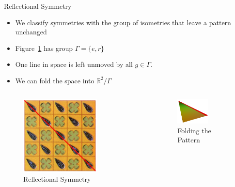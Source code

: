 \documentclass[12pt]{beamer}
\begin{document}
\begin{frame}{Reflectional Symmetry}
    \begin{itemize}
        \item We classify symmetries with the group of isometries that
            leave a pattern unchanged
        \item Figure~\ref{fig:ref_sym} has group $\Gamma = \{ e, r \} $
        \item One line in space is left unmoved by all $g \in \Gamma$.
        \item We can fold the space into $\mathbb{R}^2/\Gamma$
    \end{itemize}
    \begin{columns}
        \begin{column}[c]{0.39\textwidth}
    \begin{figure}
    \includegraphics[width=0.7\textwidth]{images/reflection_with_line.png}
    \caption{Reflectional Symmetry}
    \label{fig:ref_sym}
    \end{figure}
    \end{column}
    \begin{column}[c]{0.49\textwidth}
    \begin{figure}
    \includegraphics[width=0.6\textwidth]{images/mirror_edge.png}
    \caption{Folding the Pattern}
    \end{figure}
    \end{column}
    \end{columns}
\end{frame}
\end{document}
